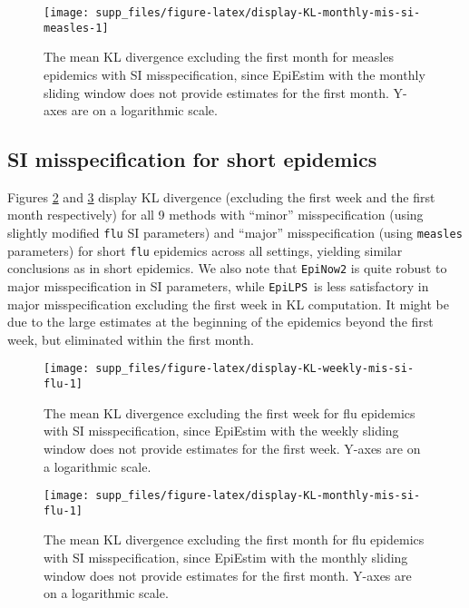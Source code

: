 \documentclass[
]{article}
\begin{document}
\begin{figure}[!ht]

{\centering \texttt{[image: supp\_files/figure-latex/display-KL-monthly-mis-si-measles-1]} 

}

\caption{The mean KL divergence excluding the first month for measles epidemics with SI misspecification, since EpiEstim with the monthly sliding window does not provide estimates for the first month. Y-axes are on a logarithmic scale.}\label{fig:display-KL-monthly-mis-si-measles}
\end{figure}

\clearpage

\subsection{SI misspecification for short epidemics}\label{si-misspecification-for-short-epidemics}

Figures \ref{fig:display-KL-weekly-mis-si-flu} and
\ref{fig:display-KL-monthly-mis-si-flu} display KL divergence (excluding the
first week and the first month respectively) for all 9 methods with ``minor''
misspecification (using slightly modified \texttt{flu} SI parameters) and ``major''
misspecification (using \texttt{measles} parameters) for short \texttt{flu} epidemics across all
settings, yielding similar conclusions as in short epidemics. We also note that
\texttt{EpiNow2} is quite robust to major misspecification in SI parameters, while
\texttt{EpiLPS}~is less satisfactory in major misspecification excluding the first
week in KL computation. It might be due to the large estimates at the beginning
of the epidemics beyond the first week, but eliminated within the first month.

\begin{figure}[!ht]

{\centering \texttt{[image: supp\_files/figure-latex/display-KL-weekly-mis-si-flu-1]} 

}

\caption{The mean KL divergence excluding the first week for flu epidemics with SI misspecification, since EpiEstim with the weekly sliding window does not provide estimates for the first week. Y-axes are on a logarithmic scale.}\label{fig:display-KL-weekly-mis-si-flu}
\end{figure}

\begin{figure}[!ht]

{\centering \texttt{[image: supp\_files/figure-latex/display-KL-monthly-mis-si-flu-1]} 

}

\caption{The mean KL divergence excluding the first month for flu epidemics with SI misspecification, since EpiEstim with the monthly sliding window does not provide estimates for the first month. Y-axes are on a logarithmic scale.}\label{fig:display-KL-monthly-mis-si-flu}
\end{figure}
\end{document}
